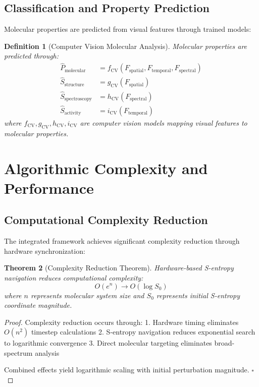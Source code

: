 \documentclass[12pt,a4paper]{article}
\newtheorem{theorem}{Theorem}[section]
\newtheorem{definition}[theorem]{Definition}
\begin{document}
\subsection{Classification and Property Prediction}

Molecular properties are predicted from visual features through trained models:

\begin{definition}[Computer Vision Molecular Analysis]
Molecular properties are predicted through:
\begin{align}
\hat{P}_{\text{molecular}} &= f_{\text{CV}}(F_{\text{spatial}}, F_{\text{temporal}}, F_{\text{spectral}}) \\
\hat{S}_{\text{structure}} &= g_{\text{CV}}(F_{\text{spatial}}) \\
\hat{S}_{\text{spectroscopy}} &= h_{\text{CV}}(F_{\text{spectral}}) \\
\hat{S}_{\text{activity}} &= i_{\text{CV}}(F_{\text{temporal}})
\end{align}
where $f_{\text{CV}}, g_{\text{CV}}, h_{\text{CV}}, i_{\text{CV}}$ are computer vision models mapping visual features to molecular properties.
\end{definition}

\section{Algorithmic Complexity and Performance}

\subsection{Computational Complexity Reduction}

The integrated framework achieves significant complexity reduction through hardware synchronization:

\begin{theorem}[Complexity Reduction Theorem]
Hardware-based S-entropy navigation reduces computational complexity:
\begin{equation}
O(e^n) \rightarrow O(\log S_0)
\end{equation}
where $n$ represents molecular system size and $S_0$ represents initial S-entropy coordinate magnitude.
\end{theorem}

\begin{proof}
Complexity reduction occurs through:
1. Hardware timing eliminates $O(n^2)$ timestep calculations
2. S-entropy navigation reduces exponential search to logarithmic convergence
3. Direct molecular targeting eliminates broad-spectrum analysis

Combined effects yield logarithmic scaling with initial perturbation magnitude. $\square$
\end{proof}
\end{document}

